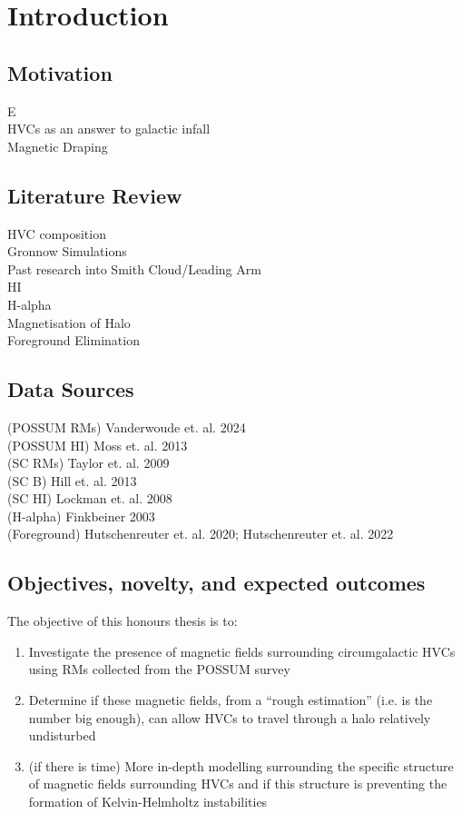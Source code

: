 \chapter{Introduction}
\label{cha:introduction}

\section{Motivation}
\label{sec:motivation}
E~\cite{LH:83} \\
HVCs as an answer to galactic infall \\
Magnetic Draping

\section{Literature Review}
\label{sec:lit-review}
HVC composition \\
Gronnow Simulations \\
Past research into Smith Cloud/Leading Arm \\
HI \\
H-alpha \\
Magnetisation of Halo \\
Foreground Elimination


\section{Data Sources}
\label{sec:sources}
(POSSUM RMs) Vanderwoude et. al. 2024 \\
(POSSUM HI) Moss et. al. 2013 \\
(SC RMs) Taylor et. al. 2009 \\
(SC B) Hill et. al. 2013 \\
(SC HI) Lockman et. al. 2008 \\
(H-alpha) Finkbeiner 2003 \\
(Foreground) Hutschenreuter et. al. 2020; Hutschenreuter et. al. 2022

\section{Objectives, novelty, and expected outcomes}
\label{sec:objectives}

The objective of this honours thesis is to:
\begin{enumerate}
\item Investigate the presence of magnetic fields surrounding circumgalactic HVCs using RMs collected from the POSSUM survey
\item Determine if these magnetic fields, from a “rough estimation” (i.e. is the number big enough), can allow HVCs to travel through a halo relatively undisturbed
\item (if there is time) More in-depth modelling surrounding the specific structure of magnetic fields surrounding HVCs and if this structure is preventing the formation of Kelvin-Helmholtz instabilities
\end{enumerate}

